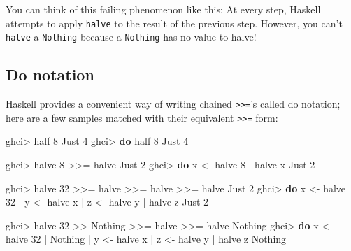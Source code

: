 \documentclass[]{article}
\newenvironment{Shaded}{}{}
\newcommand{\KeywordTok}[1]{\textcolor[rgb]{0.00,0.44,0.13}{\textbf{#1}}}
\newcommand{\DataTypeTok}[1]{\textcolor[rgb]{0.56,0.13,0.00}{#1}}
\newcommand{\DecValTok}[1]{\textcolor[rgb]{0.25,0.63,0.44}{#1}}
\newcommand{\OtherTok}[1]{\textcolor[rgb]{0.00,0.44,0.13}{#1}}
\newcommand{\FunctionTok}[1]{\textcolor[rgb]{0.02,0.16,0.49}{#1}}
\newcommand{\NormalTok}[1]{#1}
\begin{document}
You can think of this failing phenomenon like this: At every step, Haskell
attempts to apply \texttt{halve} to the result of the previous step. However,
you can't \texttt{halve} a \texttt{Nothing} because a \texttt{Nothing} has no
value to halve!

\subsection{Do notation}\label{do-notation}

Haskell provides a convenient way of writing chained
\texttt{\textgreater{}\textgreater{}=}'s called do notation; here are a few
samples matched with their equivalent \texttt{\textgreater{}\textgreater{}=}
form:

\begin{Shaded}
\begin{Highlighting}[]
\NormalTok{ghci}\FunctionTok{>}\NormalTok{ half }\DecValTok{8}
\DataTypeTok{Just} \DecValTok{4}
\NormalTok{ghci}\FunctionTok{>} \KeywordTok{do}\NormalTok{  half }\DecValTok{8}
\DataTypeTok{Just} \DecValTok{4}

\NormalTok{ghci}\FunctionTok{>}\NormalTok{ halve }\DecValTok{8} \FunctionTok{>>=}\NormalTok{ halve}
\DataTypeTok{Just} \DecValTok{2}
\NormalTok{ghci}\FunctionTok{>} \KeywordTok{do}\NormalTok{  x }\OtherTok{<-}\NormalTok{ halve }\DecValTok{8}
    \FunctionTok{|}\NormalTok{     halve x}
\DataTypeTok{Just} \DecValTok{2}

\NormalTok{ghci}\FunctionTok{>}\NormalTok{ halve }\DecValTok{32} \FunctionTok{>>=}\NormalTok{ halve }\FunctionTok{>>=}\NormalTok{ halve }\FunctionTok{>>=}\NormalTok{ halve}
\DataTypeTok{Just} \DecValTok{2}
\NormalTok{ghci}\FunctionTok{>} \KeywordTok{do}\NormalTok{  x }\OtherTok{<-}\NormalTok{ halve }\DecValTok{32}
    \FunctionTok{|}\NormalTok{     y }\OtherTok{<-}\NormalTok{ halve x}
    \FunctionTok{|}\NormalTok{     z }\OtherTok{<-}\NormalTok{ halve y}
    \FunctionTok{|}\NormalTok{     halve z}
\DataTypeTok{Just} \DecValTok{2}

\NormalTok{ghci}\FunctionTok{>}\NormalTok{ halve }\DecValTok{32} \FunctionTok{>>} \DataTypeTok{Nothing} \FunctionTok{>>=}\NormalTok{ halve }\FunctionTok{>>=}\NormalTok{ halve}
\DataTypeTok{Nothing}
\NormalTok{ghci}\FunctionTok{>} \KeywordTok{do}\NormalTok{  x }\OtherTok{<-}\NormalTok{ halve }\DecValTok{32}
    \FunctionTok{|}     \DataTypeTok{Nothing}
    \FunctionTok{|}\NormalTok{     y }\OtherTok{<-}\NormalTok{ halve x}
    \FunctionTok{|}\NormalTok{     z }\OtherTok{<-}\NormalTok{ halve y}
    \FunctionTok{|}\NormalTok{     halve z}
\DataTypeTok{Nothing}
\end{Highlighting}
\end{Shaded}
\end{document}
